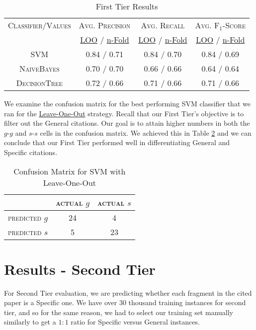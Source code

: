 \begin{table}[h]
	\center
	\begin{tabular}{ c | c  c  c }
		\textsc{Classifier/Values} & \textsc{Avg. Precision} & \textsc{Avg. Recall} & \textsc{Avg. F$_1$-Score} \\
		& \url{LOO} / \url{n-Fold} & \url{LOO} / \url{n-Fold} & \url{LOO} / \url{n-Fold} \\
		\hline
		\textsc{SVM} 			& 0.84 / 0.71 & 0.84 / 0.70 & 0.84 / 0.69 \\
		\textsc{NaiveBayes} 	& 0.70 / 0.70 & 0.66 / 0.66 & 0.64 / 0.64 \\
		\textsc{DecisionTree}	& 0.72 / 0.66 & 0.71 / 0.66 & 0.71 / 0.66
	\end{tabular}
	\caption{First Tier Results}
	\label{tab:firsttieresults}
\end{table}

We examine the confusion matrix for the best performing SVM classifier that we ran for the \url{Leave-One-Out} strategy. Recall that our First Tier's objective is to filter out the General citations. Our goal is to attain higher numbers in both the $g$-$g$ and $s$-$s$ cells in the confusion matrix. We achieved this in Table \ref{tab:svmconfusionmatrix} and we can conclude that our First Tier performed well in differentiating General and Specific citations.

\begin{table}[h]
	\center
	\begin{tabular}{ c | c  c }
		 & \textsc{actual $g$} & \textsc{actual $s$} \\
		\hline
		\textsc{predicted $g$} 	& 24 & 4 \\
		\textsc{predicted $s$}		& 5 & 23
	\end{tabular}
	\caption{Confusion Matrix for SVM with Leave-One-Out}
	\label{tab:svmconfusionmatrix}
\end{table}

\section{Results - Second Tier}
For Second Tier evaluation, we are predicting whether each fragment in the cited paper is a Specific one. We have over 30 thousand training instances for second tier, and so for the same reason, we had to select our training set manually similarly to get a $1:1$ ratio for Specific versus General instances.

